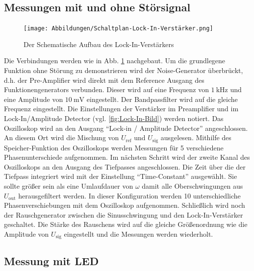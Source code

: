 \subsection{Messungen mit und ohne Störsignal}
\begin{figure}
    \texttt{[image: Abbildungen/Schaltplan-Lock-In-Verstärker.png]}
    \caption{Der Schematische Aufbau des Lock-In-Verstärkers \cite[][]{man:v303}}
    \label{fig:Lock-In-Schema}
\end{figure}
Die Verbindungen werden wie in Abb. \ref{fig:Lock-In-Schema} nachgebaut.
Um die grundlegene Funktion ohne Störung zu demonstrieren wird der Noise-Generator überbrückt,
d.h. der Pre-Amplifier wird direkt mit dem Reference Ausgang des Funktionengenerators verbunden.
Dieser wird auf eine Frequenz von $\qty[]{1}{\kilo\hertz}$ und eine Amplitude von $\qty{10}{\milli\volt}$ eingestellt.
Der Bandpassfilter wird auf die gleiche Frequenz eingestellt.
Die Einstellungen der Verstärker im Preamplifier und im Lock-In/Amplitude Detector (vgl. \ref{fig:Lock-In-Bild}) werden notiert. 
Das Oszilloskop wird an den Ausgang \enquote{Lock-in / Amplitude Detector} angeschlossen.
An diesem Ort wird die Mischung von $U_\text{ref}$  und $U_\text{sig}$ ausgelesen.
Mithilfe des Speicher-Funktion des Oszilloskops werden Messungen für 5 verschiedene Phasenunterschiede aufgenommen.
Im nächsten Schritt wird der zweite Kanal des Oszilloskops an den Ausgang des Tiefpasses angeschlossen.
Die Zeit über die der Tiefpass integriert wird mit der Einstellung \enquote{Time-Constant} ausgewählt. 
Sie sollte größer sein als eine Umlaufdauer von $\omega$ damit alle Oberschwingungen aus $U_\text{out}$ herausgefiltert werden.
In dieser Konfiguration werden 10 unterschiedliche Phasenverschiebungen mit dem Oszilloskop aufgenommen.
%
Schließlich wird noch der Rauschgenerator zwischen die Sinusschwingung und den Lock-In-Verstärker geschaltet.
Die Stärke des Rauschens wird auf die gleiche Größenordnung wie die Amplitude von $U_\text{sig}$ eingestellt 
und die Messungen werden wiederholt.

\subsection{Messung mit LED}

